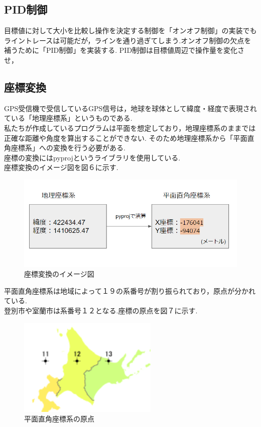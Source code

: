 \documentclass[submit,techrep,noauthor]{ipsj}
\begin{document}
\subsection{PID制御}
目標値に対して大小を比較し操作を決定する制御を「オンオフ制御」の実装でもライントレースは可能だが，ラインを通り過ぎてしまう.オンオフ制御の欠点を補うために「PID制御」を実装する.
PID制御は目標値周辺で操作量を変化させ，
\subsection{座標変換}
GPS受信機で受信しているGPS信号は，地球を球体として緯度・経度で表現されている「地理座標系」というものである.\\
私たちが作成しているプログラムは平面を想定しており，地理座標系のままでは正確な距離や角度を算出することができない.
そのため地理座標系から「平面直角座標系」への変換を行う必要がある.\\
座標の変換にはpyprojというライブラリを使用している.\\
座標変換のイメージ図を図６に示す.

\begin{figure}[h]
 \centering
   \includegraphics[scale=0.48]{GPS2xy.png}
 \caption{座標変換のイメージ図}
 \label{仮想ライントレースのイメージ図}
\end{figure}

平面直角座標系は地域によって１９の系番号が割り振られており，原点が分かれている.\\
登別市や室蘭市は系番号１２となる.座標の原点を図７に示す.\\

\begin{figure}[h]
 \centering
   \includegraphics[scale=1.0]{origin.png}
 \caption{平面直角座標系の原点}
 \label{origin}
\end{figure}
\end{document}
